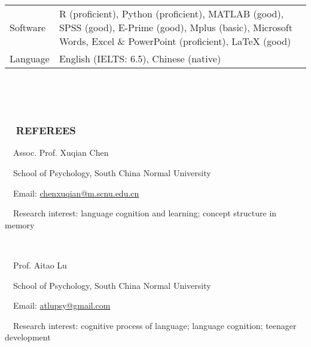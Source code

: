 \documentclass[a4paper, 12pt]{article}
\begin{document}
\begin{tabularx}{\textwidth}{p{2cm} X}
    
    Software & R (proficient), Python (proficient), MATLAB (good), SPSS (good), E-Prime (good), Mplus (basic), Microsoft Words, Excel \& PowerPoint (proficient), LaTeX (good) \\
    
    Language & English (IELTS: 6.5), Chinese (native) \\
    
    \end{tabularx}

\  \par
\  \par


\subsubsection*{ \ \ REFEREES}

\ \ Assoc. Prof. Xuqian Chen \par
\ \ School of Psychology, South China Normal University \par
\ \ Email: \href{mailto: chenxuqian@m.scnu.edu.cn}{chenxuqian@m.scnu.edu.cn} \par
\ \ Research interest: language cognition and learning; concept structure in memory	\par

\ \par

\ \ Prof. Aitao Lu  \par
\ \ School of Psychology, South China Normal University \par
\ \ Email: \href{mailto: atlupsy@gmail.com}{atlupsy@gmail.com} \par
\ \ Research interest: cognitive process of language; language cognition; teenager development \par
\end{document}
